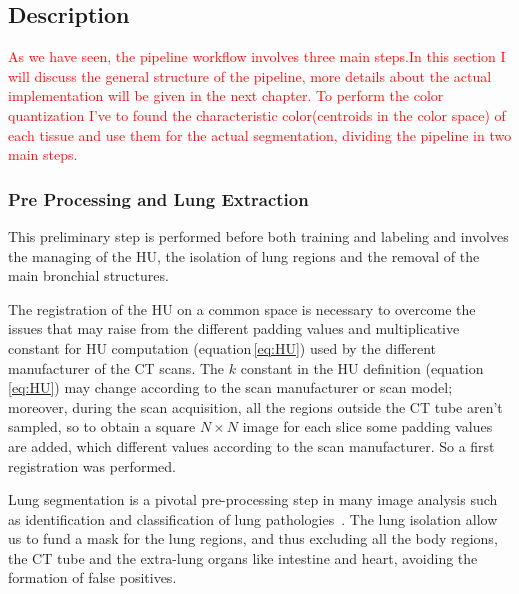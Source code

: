\documentclass{standalone}
\begin{document}
	\subsection{Description}
	
	\textcolor{red}{As we have seen, the pipeline workflow involves three main steps.In this section I will discuss the general structure of the pipeline, more details about the actual implementation will be given in the next chapter.
	To perform the color quantization I've to found the characteristic color(centroids in the color space) of each tissue and use them for the actual segmentation, dividing the pipeline in two main steps.}

	
	\subsubsection*{Pre Processing and Lung Extraction}
	
	This preliminary step is performed before both training and labeling and involves the managing of the HU, the isolation of lung regions and the removal of the main bronchial structures.
	
	The registration of the HU on a common space is necessary to overcome the issues that may raise from the different padding values and multiplicative constant for HU computation (equation\,\ref{eq:HU}) used by the different manufacturer of the CT scans. The $k$ constant in the HU definition (equation\,\ref{eq:HU}) may change according to the scan manufacturer or scan model; moreover, during the scan acquisition, all the regions outside the CT tube aren't sampled, so to obtain a square $N\times N$ image for each slice some padding values are added, which different values according to the scan manufacturer. So a first registration was performed.
	
	
	Lung segmentation is a pivotal pre-processing step in many image analysis such as identification and classification of lung pathologies~\cite{ART:Johannes}. The lung isolation allow us to fund a mask for the lung regions, and thus excluding  all the body regions, the CT tube and the extra-lung organs like intestine and heart, avoiding the formation of false positives.
	
\end{document}
